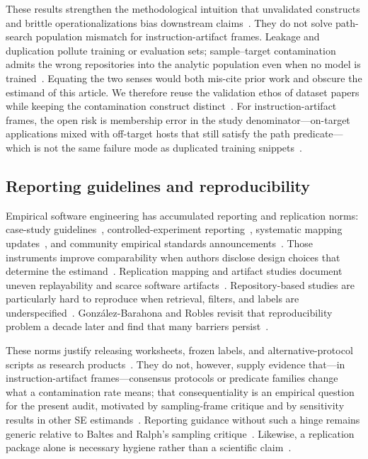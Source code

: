 These results strengthen the methodological intuition that unvalidated constructs and brittle operationalizations bias downstream claims~\cite{herbold2022szz,shepperd2013nasa,zimmermann2008}.
They do not solve path-search population mismatch for instruction-artifact frames.
Leakage and duplication pollute training or evaluation sets; sample--target contamination admits the wrong repositories into the analytic population even when no model is trained~\cite{kalliamvakou2015indepth,baltes2022sampling}.
Equating the two senses would both mis-cite prior work and obscure the estimand of this article.
We therefore reuse the validation ethos of dataset papers while keeping the contamination construct distinct~\cite{herbold2022szz,dambros2012defectbenchmark}.
For instruction-artifact frames, the open risk is membership error in the study denominator---on-target applications mixed with off-target hosts that still satisfy the path predicate---which is not the same failure mode as duplicated training snippets~\cite{kalliamvakou2015indepth,baltes2022sampling,lopes2017dejavu}.

\subsection{Reporting guidelines and reproducibility}
\label{subsec:rw-reporting}

Empirical software engineering has accumulated reporting and replication norms: case-study guidelines~\cite{runeson2009}, controlled-experiment reporting~\cite{jedlitschka2005reporting}, systematic mapping updates~\cite{petersen2015mapping}, and community empirical standards announcements~\cite{ralph2021standards}.
Those instruments improve comparability when authors disclose design choices that determine the estimand~\cite{jedlitschka2005reporting,runeson2009,ralph2021standards}.
Replication mapping and artifact studies document uneven replayability and scarce software artifacts~\cite{silva2012replication,heumuller2020,winter2022artifacts,liu2024researchartifacts}.
Repository-based studies are particularly hard to reproduce when retrieval, filters, and labels are underspecified~\cite{gonzalez2011repro,gonzalez2023revisit}.
Gonz{\'a}lez-Barahona and Robles revisit that reproducibility problem a decade later and find that many barriers persist~\cite{gonzalez2023revisit}.

These norms justify releasing worksheets, frozen labels, and alternative-protocol scripts as research products~\cite{heumuller2020,winter2022artifacts,liu2024researchartifacts}.
They do not, however, supply evidence that---in instruction-artifact frames---consensus protocols or predicate families change what a contamination rate means; that consequentiality is an empirical question for the present audit, motivated by sampling-frame critique and by sensitivity results in other SE estimands~\cite{baltes2022sampling,tantithamthavorn2017validation}.
Reporting guidance without such a hinge remains generic relative to Baltes and Ralph's sampling critique~\cite{baltes2022sampling}.
Likewise, a replication package alone is necessary hygiene rather than a scientific claim~\cite{heumuller2020,gonzalez2023revisit}.

